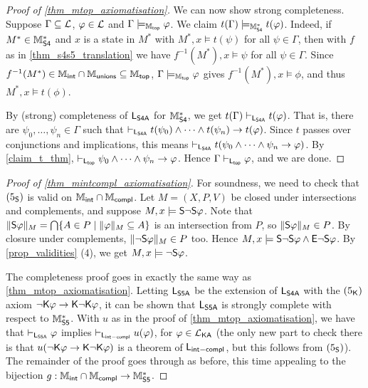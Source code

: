 \begin{proof}[Proof of \cref{thm_mtop_axiomatisation}]
We can now show strong completeness. Suppose $\Gamma \subseteq \cL$, $\phi \in
\cL$ and $\Gamma \models_{\Mtop} \phi$. We claim $t(\Gamma) \models_{\Msfour}
t(\phi)$. Indeed, if $M^* \in \Msfour$ and $x$ is a state in $M^*$ with $M^*, x
\models t(\psi)$ for all $\psi \in \Gamma$, then with $f$ as in
\cref{thm_s4s5_translation} we have $f^{-1}(M^*), x \models \psi$ for all $\psi
\in \Gamma$. Since $f^{-1}(M^*) \in \Mint \cap \Munions \subseteq \Mtop$,
$\Gamma \models_{\Mtop} \phi$ gives $f^{-1}(M^*), x \models \phi$, and thus
$M^*, x \models t(\phi)$.

By (strong) completeness of $\sLsfoura$ for $\Msfour$, we get $t(\Gamma)
\entails_{\sLsfoura} t(\phi)$. That is, there are $\psi_0, \ldots, \psi_n \in
\Gamma$ such that $\entails_{\sLsfoura} t(\psi_0) \land \cdots \land t(\psi_n)
\limplies t(\phi)$. Since $t$ passes over conjunctions and implications, this
means $\entails_{\sLsfoura} t(\psi_0 \land \cdots \land \psi_n \limplies
\phi)$. By \cref{claim_t_thm}, $\entails_{\sLtop} \psi_0 \land \cdots \land
\psi_n \limplies \phi$. Hence $\Gamma \entails_{\sLtop} \phi$, and we are done.

\end{proof}

\begin{proof}[Proof of \cref{thm_mintcompl_axiomatisation}]
    For soundness, we need to check that $\fivesoundness$ is valid on
    $\Mint \cap \Mcompl$. Let $M = (X, P, V)$ be closed under intersections and
    complements, and suppose $M, x \models \S\neg\S\phi$. Note that
    $\|\S\phi\|_M = \bigcap\{A \in P \mid \|\phi\|_M \subseteq A\}$ is an
    intersection from $P$, so $\|\S\phi\|_M \in P$. By closure under
    complements, $\|\neg\S\phi\|_M \in P$ too. Hence $M, x \models \S\neg\S\phi
    \land \E\neg\S\phi$. By \cref{prop_validities} (4), we get $M, x \models
    \neg\S\phi$.

    The completeness proof goes in exactly the same way as
    \cref{thm_mtop_axiomatisation}. Letting $\sLsfivea$ be the extension of
    $\sLsfoura$ with the $\fivek$ axiom $\neg\K\phi \limplies \K\neg\K\phi$, it
    can be shown that $\sLsfivea$ is strongly complete with respect to
    $\Msfive$.  With $u$ as in the proof of \cref{thm_mtop_axiomatisation}, we
    have that $\entails_{\sLsfivea} \phi$ implies $\entails_{\sLintcompl}
    u(\phi)$, for $\phi \in \cLKA$ (the only new part to check there is that
    $u(\neg\K\phi \limplies \K\neg\K\phi)$ is a theorem of $\sLintcompl$, but
    this follows from $\fivesoundness$). The remainder of the proof goes
    through as before, this time appealing to the bijection $g: \Mint \cap
    \Mcompl \to \Msfive$.

\end{proof}

